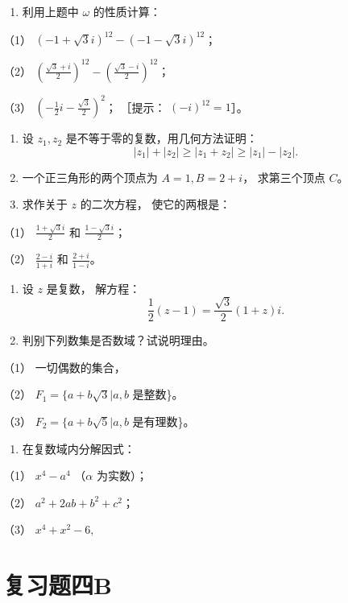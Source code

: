 \begin{enumerate}[start=11]
\item
  利用上题中 \(\omega\) 的性质计算：
\end{enumerate}

（1） \((-1 + \sqrt{3} i)^{12} - (-1 - \sqrt{3} i)^{12}\)；

（2）
\(\left(\frac{\sqrt{3} + i}{2}\right)^{12} - \left(\frac{\sqrt{3} - i}{2}\right)^{12}\)；

（3） \(\left(-\frac{1}{2} i - \frac{\sqrt{3}}{2}\right)^2\)； ［提示：
\((-i)^{12} = 1\)］。

\begin{enumerate}[start=12]
\item
  设 \(z_{1}, z_{2}\) 是不等于零的复数，用几何方法证明：
\[
\left| z _ {1} \right| + \left| z _ {2} \right| \geqslant \left| z _ {1} + z _ {2} \right| \geqslant \left| z _ {1} \right| - \left| z _ {2} \right|.
\]
\item
  一个正三角形的两个顶点为 \(A = 1, B = 2 + i\)， 求第三个顶点 \(C\)。
\item
  求作关于 \(z\) 的二次方程， 使它的两根是：
\end{enumerate}

（1） \(\frac{1 + \sqrt{3}i}{2}\) 和 \(\frac{1 - \sqrt{3}i}{2}\)；

（2） \(\frac{2 - i}{1 + i}\) 和 \(\frac{2 + i}{1 - i}\)。

\begin{enumerate}[start=15]
\item
  设 \(z\) 是复数， 解方程：
\[
\frac {1}{2} (z - 1) = \frac {\sqrt {3}}{2} (1 + z) i.
\]
\item
  判别下列数集是否数域？试说明理由。
\end{enumerate}

（1） 一切偶数的集合，

（2） \(F_{1} = \{a + b\sqrt{3} | a, b\) 是整数\}。

（3） \(F_{2} = \{a + b\sqrt{5} | a, b\) 是有理数\}。

\begin{enumerate}[start=17]
\item
  在复数域内分解因式：
\end{enumerate}

（1） \(x^{4} - a^{4}\) （\(\alpha\) 为实数）；

（2） \(a^2 + 2ab + b^2 + c^2\)；

（3） \(x^{4} + x^{2} - 6,\)

\section{复习题四B}

